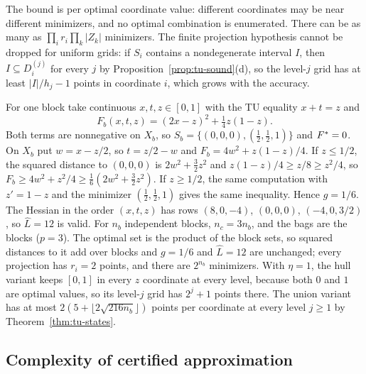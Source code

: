 The bound is per optimal coordinate value: different coordinates may be
near different minimizers, and no optimal combination is enumerated. There
can be as many as $\prod_ir_i\prod_k\lvert Z_k\rvert$ minimizers. The finite
projection hypothesis cannot be dropped for uniform grids: if $S_i$ contains a
nondegenerate interval $I$, then $I\subseteq D^{(j)}_i$ for every $j$ by
Proposition~\ref{prop:tu-sound}(d), so the level-$j$ grid has at least
$\lvert I\rvert/h_j-1$ points in coordinate $i$, which grows with the accuracy.

\begin{example}\label{ex:tu-union}
For one block take continuous $x,t,z\in[0,1]$ with the TU equality $x+t=z$
and
\[
F_b(x,t,z)=(2x-z)^2+\tfrac14z(1-z).
\]
Both terms are nonnegative on $X_b$, so $S_b=\{(0,0,0),(\tfrac12,\tfrac12,1)\}$
and $F^*=0$. On $X_b$ put $w=x-z/2$, so $t=z/2-w$ and
$F_b=4w^2+z(1-z)/4$. If $z\le1/2$, the squared distance to $(0,0,0)$ is
$2w^2+\frac32z^2$ and $z(1-z)/4\ge z/8\ge z^2/4$, so
$F_b\ge4w^2+z^2/4\ge\frac16(2w^2+\frac32z^2)$. If $z\ge1/2$, the same
computation with $z'=1-z$ and the minimizer $(\frac12,\frac12,1)$ gives the
same inequality. Hence $g=1/6$. The Hessian in the order $(x,t,z)$ has rows
$(8,0,-4)$, $(0,0,0)$, $(-4,0,3/2)$, so $\hat L=12$ is valid. For $n_b$
independent blocks, $n_c=3n_b$, and the bags are the blocks ($p=3$). The
optimal set is the product of the block sets, so squared distances to it add
over blocks and $g=1/6$ and $\hat L=12$ are unchanged; every projection has
$r_i=2$ points, and there are $2^{n_b}$ minimizers. With $\eta=1$, the hull variant keeps $[0,1]$ in every $z$
coordinate at every level, because both $0$ and $1$ are optimal values, so
its level-$j$ grid has $2^j+1$ points there. The union variant has at most
$2(5+\lfloor2\sqrt{216n_b}\rfloor)$ points per coordinate at every level
$j\ge1$ by Theorem~\ref{thm:tu-states}.
\end{example}

\subsection{Complexity of certified approximation}\label{sec:tu-complexity}

